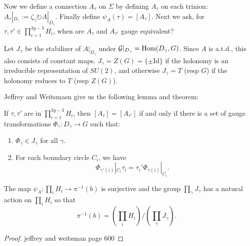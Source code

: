 	Now we define a connection $A_\tau$ on $\Sigma$ by defining $A_\tau$ on each trinion: $A_\tau|_{D_\gamma} := \zeta_\gamma \circlearrowright A|_{D_\gamma}$. Finally define $\psi_A(\tau) = [A_\tau]$. Next we ask, for $\tau,\tau' \in \prod_{i=1}^{3g-3} H_i$, when are $A_\tau$ and $A_{\tau'}$ gauge equivalent? 
	
	Let $J_\gamma$ be the stabilizer of $A|_{D_\gamma}$ under $\mathcal{G}|_{D_\gamma} = \text{Hom}(D_\gamma,G)$. Since $A$ is a.t.d., this also consists of constant maps. $J_\gamma = Z(G) = \{\pm \text{Id}\}$ if the holonomy is an irreducible representation of $SU(2)$, and otherwise $J_\gamma =T$ (resp $G$) if the holonomy reduces to $T$ (resp $Z(G)$).  
	
	Jeffrey and Weitsmasn give us the following lemma and theorem:
	\begin{theorem}
		If $\tau,\tau'$ are in $\prod_{i=1}^{3g-3} H_i$, then $[A_\tau] = [A_{\tau'}]$ if and only if there is a set of gauge transformations $\Phi_\gamma:D_\gamma \to G$ such that:
		\begin{enumerate}
			\item $\Phi_\gamma \in J_\gamma$ for all $\gamma$.
			\item For each boundary circle $C_i$, we have
			$$
				\Phi_{\gamma'(i)}|_{C_i} \tau_i = \tau_i' \Phi_{\gamma(i)}|_{C_i}.
			$$
		\end{enumerate}
	\end{theorem} 
	\begin{theorem}
		The map $\psi_A:\prod_i H_i \to \pi^{-1}(b)$ is surjective and the group $\prod_\gamma J_\gamma$ has a natural action on $\prod_i H_i$ so that
		\begin{equation}
			\pi^{-1}(b) = \left(\prod_i H_i\right)/\left(\prod_\gamma J_\gamma\right).
		\end{equation}
	\end{theorem}
	\begin{proof}
		jeffrey and weitsman page 600
	\end{proof}

